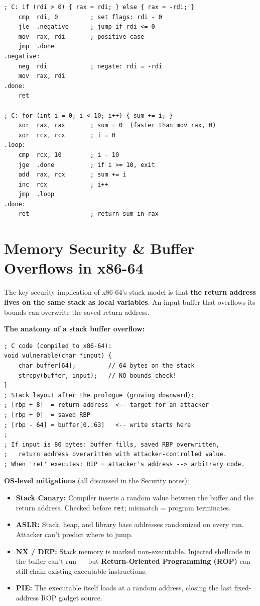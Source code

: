 \documentclass[11pt, letterpaper]{article}
\begin{document}
\begin{lstlisting}[style=x86, caption={C control flow translated to x86-64}]
; C: if (rdi > 0) { rax = rdi; } else { rax = -rdi; }
    cmp  rdi, 0         ; set flags: rdi - 0
    jle  .negative      ; jump if rdi <= 0
    mov  rax, rdi       ; positive case
    jmp  .done
.negative:
    neg  rdi            ; negate: rdi = -rdi
    mov  rax, rdi
.done:
    ret

; C: for (int i = 0; i < 10; i++) { sum += i; }
    xor  rax, rax       ; sum = 0  (faster than mov rax, 0)
    xor  rcx, rcx       ; i = 0
.loop:
    cmp  rcx, 10        ; i - 10
    jge  .done          ; if i >= 10, exit
    add  rax, rcx       ; sum += i
    inc  rcx            ; i++
    jmp  .loop
.done:
    ret                 ; return sum in rax
\end{lstlisting}

\section*{Memory Security \& Buffer Overflows in x86-64}

The key security implication of x86-64's stack model is that \textbf{the return address lives on the same stack as local variables}. An input buffer that overflows its bounds can overwrite the saved return address.

\textbf{The anatomy of a stack buffer overflow:}

\begin{lstlisting}[style=x86, caption={C code and the dangerous stack layout it creates}]
; C code (compiled to x86-64):
void vulnerable(char *input) {
    char buffer[64];         // 64 bytes on the stack
    strcpy(buffer, input);   // NO bounds check!
}
; Stack layout after the prologue (growing downward):
; [rbp + 8]  = return address  <-- target for an attacker
; [rbp + 0]  = saved RBP
; [rbp - 64] = buffer[0..63]   <-- write starts here
;
; If input is 80 bytes: buffer fills, saved RBP overwritten,
;   return address overwritten with attacker-controlled value.
; When 'ret' executes: RIP = attacker's address --> arbitrary code.
\end{lstlisting}

\textbf{OS-level mitigations} (all discussed in the Security notes):
\begin{itemize}[noitemsep]
  \item \textbf{Stack Canary:} Compiler inserts a random value between the buffer and the return address. Checked before \texttt{ret}; mismatch = program terminates.
  \item \textbf{ASLR:} Stack, heap, and library base addresses randomized on every run. Attacker can't predict where to jump.
  \item \textbf{NX / DEP:} Stack memory is marked non-executable. Injected shellcode in the buffer can't run --- but \textbf{Return-Oriented Programming (ROP)} can still chain existing executable instructions.
  \item \textbf{PIE:} The executable itself loads at a random address, closing the last fixed-address ROP gadget source.
\end{itemize}
\end{document}
